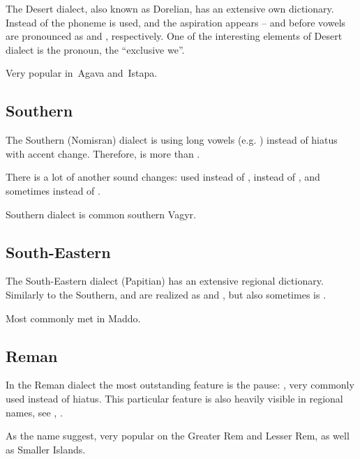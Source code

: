 The Desert dialect, also known as Dorelian, has an extensive own dictionary.
Instead of  the  phoneme is used, and the aspiration appears --
 and  before vowels are pronounced as  and ,
respectively. One of the interesting elements of Desert dialect is the
 pronoun, the ``exclusive we''.

Very popular in~Agava and~Istapa.

\subsection{Southern}

The Southern (Nomisran) dialect is using long vowels (e.g. ) instead of
hiatus with accent change. Therefore,  is more  than
.

There is a lot of another sound changes:  used instead of , 
instead of , and sometimes  instead of .

Southern dialect is common southern Vagyr.

\subsection{South-Eastern}

The South-Eastern dialect (Papitian) has an extensive regional dictionary.
Similarly to the Southern,  and  are realized as  and ,
but also sometimes  is .

Most commonly met in Maddo.

\subsection{Reman}

In the Reman dialect the most outstanding feature is the pause: \xt{|}, very
commonly used instead of hiatus. This particular feature is also heavily visible
in regional names, see , .

As the name suggest, very popular on the Greater Rem and Lesser Rem, as well as
Smaller Islands.
